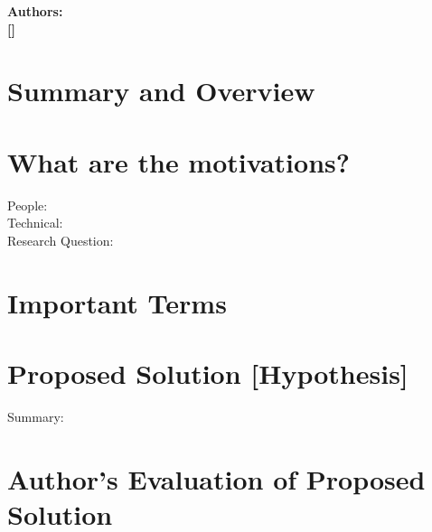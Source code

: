\documentclass[letterpaper,10pt]{article}
\title{}
\author{Nathan Dautenhahn \\ University of Illinois at Urbana Champaign }
\date{\today}
\begin{document}
\maketitle


\begin{center}
    \textbf{Authors:} 
    \\\textbf{[]}
\end{center}

\section{Summary and Overview}

\section{What are the motivations?}

  \begin{description}
    \item[People:] 

    \item[Technical:] 

    \item[Research Question:] 

  \end{description}

\section{Important Terms}
  \begin{description}
  	\item[]
  \end{description}

\section{Proposed Solution [Hypothesis]}
  \begin{description}
    \item[Summary:] 
  \end{description}

\section{Author's Evaluation of Proposed Solution}
  
\end{document}
